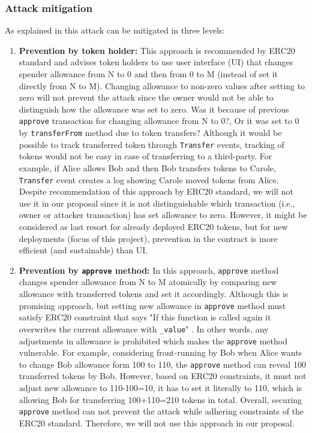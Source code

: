 \subsubsection{Attack mitigation}
As explained in \cite{ERC20MWA} this attack can be mitigated in three levels:
\begin{enumerate}
	\item \textbf{Prevention by token holder:} This approach is recommended by ERC20 standard \cite{ERC20Std} and advises token holders to use user interface (UI) that changes spender allowance from N to 0 and then from 0 to M (instead of set it directly from N to M). Changing allowance to non-zero values after setting to zero will not prevent the attack since the owner would not be able to distinguish how the allowance was set to zero. Was it because of previous \texttt{approve} transaction for changing allowance from N to 0?, Or it was set to 0 by \texttt{transferFrom} method due to token transfers? Although it would be possible to track transferred token through \texttt{Transfer} events, tracking of tokens would not be easy in case of transferring to a third-party. For example, if Alice allows Bob and then Bob transfers tokens to Carole, \texttt{Transfer} event creates a log showing Carole moved tokens from Alice. Despite recommendation of this approach by ERC20 standard, we will not use it in our proposal since it is not distinguishable which transaction (i.e., owner or attacker transaction) has set allowance to zero. However, it might be considered as last resort for already deployed ERC20 tokens, but for new deployments (focus of this project), prevention in the contract is more efficient (and sustainable) than UI.

	\item \textbf{Prevention by \texttt{approve} method:} In this approach, \texttt{approve} method changes spender allowance from N to M atomically by comparing new allowance with transferred tokens and set it accordingly. Although this is promising approach, but setting new allowance in \texttt{approve} method must satisfy ERC20 constraint that says "If this function is called again it overwrites the current allowance with \texttt{\_value}" \cite{ERC20Std}. In other words, any adjustments in allowance is prohibited which makes the \texttt{approve} method vulnerable. For example, considering front-running by Bob when Alice wants to change Bob allowance form 100 to 110, the \texttt{approve} method can reveal 100 transferred tokens by Bob. However, based on ERC20 constraints, it must not adjust new allowance to 110-100=10, it has to set it literally to 110, which is allowing Bob for transferring 100+110=210 tokens in total. Overall, securing \texttt{approve} method can not prevent the attack while adhering constraints of the ERC20 standard. Therefore, we will not use this approach in our proposal.


\end{enumerate}
